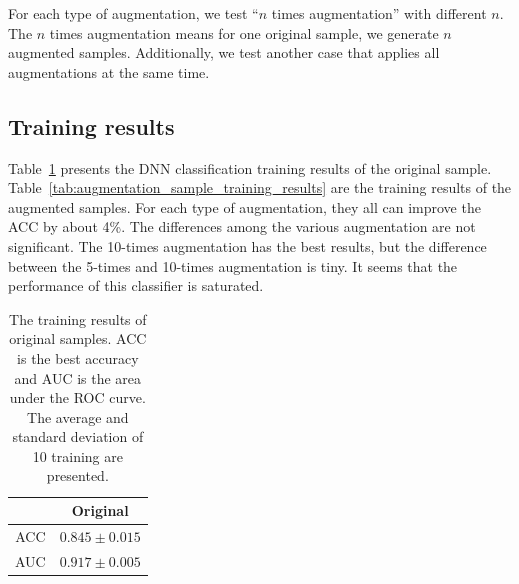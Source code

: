 \documentclass[12pt]{article}
\begin{document}
		For each type of augmentation, we test ``$n$ times augmentation'' with different $n$. The $n$ times augmentation means for one original sample, we generate $n$ augmented samples. Additionally, we test another case that applies all augmentations at the same time.
	\subsection{Training results}%
	\label{sub:training_results_physical_augmentation}
	
		Table~\ref{tab:original_sample_training_results} presents the DNN classification training results of the original sample. Table~\ref{tab:augmentation_sample_training_results} are the training results of the augmented samples. For each type of augmentation, they all can improve the ACC by about 4\%. The differences among the various augmentation are not significant. The 10-times augmentation has the best results, but the difference between the 5-times and 10-times augmentation is tiny. It seems that the performance of this classifier is saturated.
		\begin{table}[htpb]
			\centering
			\caption{The training results of original samples. ACC is the best accuracy and AUC is the area under the ROC curve. The average and standard deviation of 10 training are presented.}
			\label{tab:original_sample_training_results}
			\begin{tabular}{c|c}
			    & Original \\ \hline
			ACC & $0.845 \pm 0.015$    \\
			AUC & $0.917 \pm 0.005$    
			\end{tabular}
		\end{table}
\end{document}
